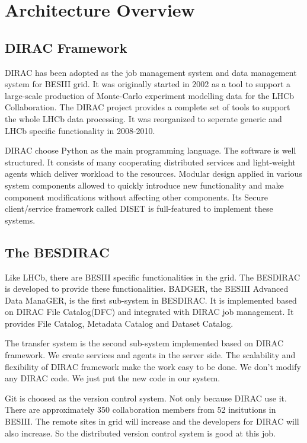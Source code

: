 \section{Architecture Overview}

\subsection{DIRAC Framework}

DIRAC has been adopted as the job management system and data management
system for BESIII grid. It was originally started in 2002 as a tool
to support a large-scale production of Monte-Carlo experiment modelling
data for the LHCb Collaboration. The DIRAC project provides a 
complete set of tools to support the whole LHCb data processing.
It was reorganized to seperate generic and LHCb specific functionality
in 2008-2010.

DIRAC choose Python as the main programming language.
The software is well structured. 
It consists of many cooperating distributed services and light-weight
agents which deliver workload to the resources.
Modular design applied in various system components allowed to quickly
introduce new functionality and make component modifications without
affecting other components.
Its Secure client/service framework called DISET is full-featured
to implement these systems.

\subsection{The BESDIRAC}

Like LHCb, there are BESIII specific functionalities in the grid.
The BESDIRAC is developed to provide these functionalities.
BADGER, the BESIII Advanced Data ManaGER, is the first sub-system
in BESDIRAC. It is implemented based on DIRAC File Catalog(DFC)
and integrated with DIRAC job management.
It provides File Catalog, Metadata Catalog and Dataset Catalog.

The transfer system is the second sub-system implemented based on
DIRAC framework. We create services and agents in the server side.
The scalability and flexibility of DIRAC framework make the work
easy to be done. We don't modify any DIRAC code. We just put the 
new code in our system.

Git is choosed as the version control system.
Not only because DIRAC use it. There are approximately 350
collaboration members from 52 insitutions in BESIII.
The remote sites in grid will increase and the developers for DIRAC
will also increase. So the distributed version control system 
is good at this job.


